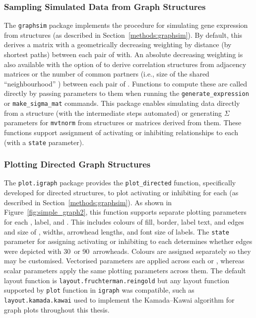 \subsubsection{Sampling Simulated Data from Graph Structures}
The \texttt{graphsim} package implements the procedure for simulating \gls{gene expression} from  structures (as described in Section~\ref{methods:graphsim}). By default, this derives a matrix with a geometrically decreasing weighting by distance (by \glspl{shortest path}) between each pair of  with. An absolute decreasing weighting is also available with the option of to derive correlation structures from adjacency matrices or the number of  common partners (i.e., size of the shared ``neighbourhood'' \citep{Hell1976}) between each pair of . Functions to compute these are called directly by passing parameters to them when running the \texttt{generate\_expression} or \texttt{make\_sigma\_mat} commands. This package enables simulating  data directly from a  structure (with the intermediate steps automated) or generating $\Sigma$ parameters for \texttt{mvtnorm} from  structures or matrices derived from them. These functions support assignment of activating or inhibiting relationships to each  (with a \texttt{state} parameter).

\subsubsection{Plotting Directed Graph Structures}
The \texttt{plot.igraph} package provides the \texttt{plot\_directed} function, specifically developed for directed  structures, to plot activating or inhibiting for each  (as described in Section~\ref{methods:graphsim}). As shown in Figure~\ref{fig:simple_graph2}, this function supports separate plotting parameters for each ,  label, and . This includes colours of  fill, border, label text, and \glspl{edge} and size of ,  widths, arrowhead lengths, and font size of labels. The  \texttt{state} parameter for assigning activating or inhibiting to each  determines whether \glspl{edge} were depicted with 30\textdegree\ or 90\textdegree\ arrowheads. Colours are assigned separately so they may be customised. Vectorised parameters are applied across each  or , whereas scalar parameters apply the same plotting parameters across them. The default layout function is \texttt{layout.fruchterman.reingold} but any layout function supported by \texttt{plot} function in \texttt{igraph} \citep{igraph} was compatible, such as \texttt{layout.kamada.kawai} used to implement the Kamada--Kawai algorithm \citep{Kamada1989} for graph plots throughout this thesis.
 

